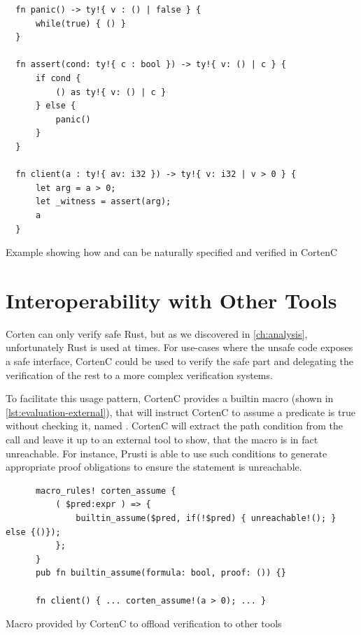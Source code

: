 \documentclass[twoside, english, final]{sdqthesis}
\theoremstyle{definition}
\begin{document}
\begin{listing}[h]
  \begin{verbatim}
  fn panic() -> ty!{ v : () | false } {
      while(true) { () }
  }

  fn assert(cond: ty!{ c : bool }) -> ty!{ v: () | c } {
      if cond {
          () as ty!{ v: () | c }
      } else {
          panic()
      }
  }

  fn client(a : ty!{ av: i32 }) -> ty!{ v: i32 | v > 0 } {
      let arg = a > 0;
      let _witness = assert(arg);
      a
  }
  \end{verbatim}
  \caption{Example showing how  and  can be naturally specified and verified in CortenC}
  \label{lst:eval-builtins}
\end{listing}


\section{Interoperability with Other Tools}

Corten can only verify safe Rust, but as we discovered in \cref{ch:analysis}, unfortunately  Rust is used at times.
For use-cases where the unsafe code exposes a safe interface, CortenC could be used to verify the safe part and delegating the verification of the rest to a more complex verification systems. 

To facilitate this usage pattern, CortenC provides a builtin macro (shown in \cref{lst:evaluation-external}), that will instruct CortenC to assume a predicate is true without checking it, named . CortenC will extract the path condition from the call and leave it up to an external tool to show, that the  macro is in fact unreachable. For instance, Prusti\cite{astrauskas_leveraging_2019} is able to use such conditions to generate appropriate proof obligations to ensure the statement is unreachable.


\begin{listing}[h]
  \begin{minipage}[t]{0.48\linewidth}
    \begin{verbatim}
      macro_rules! corten_assume {
          ( $pred:expr ) => {
              builtin_assume($pred, if(!$pred) { unreachable!(); } else {()});
          };
      }
      pub fn builtin_assume(formula: bool, proof: ()) {}

      fn client() { ... corten_assume!(a > 0); ... }
    \end{verbatim}
  \end{minipage}
  \caption{Macro provided by CortenC to offload verification to other tools}
  \label{lst:evaluation-external}
\end{listing}
\end{document}
